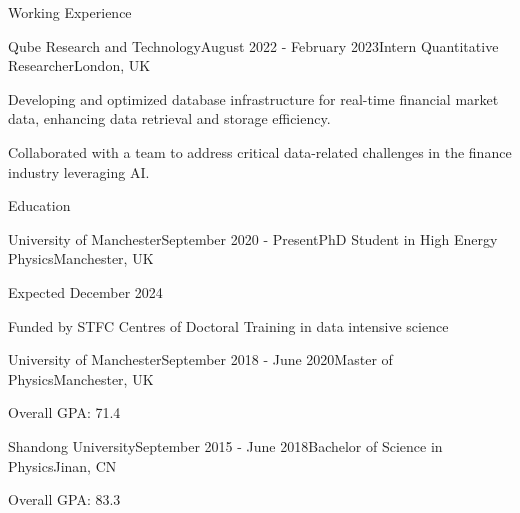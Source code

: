 \documentclass{resume} %
\begin{document}
    \begin{rSection}{Working Experience}
        \begin{rSubsection}{Qube Research and Technology}{August 2022 - February 2023}{Intern Quantitative Researcher}{London, UK}
            \item Developing and optimized database infrastructure for real-time financial market data, enhancing data retrieval and storage efficiency.
            \item Collaborated with a team to address critical data-related challenges in the finance industry leveraging AI.
        \end{rSubsection}
    \end{rSection}



    \begin{rSection}{Education}
        \begin{rSubsection}{University of Manchester}{September 2020 - Present}{PhD Student in High Energy Physics}{Manchester, UK}
            \item Expected December 2024 
            \item Funded by STFC Centres of Doctoral Training in data intensive science
        \end{rSubsection}
        \begin{rSubsection}{University of Manchester}{September 2018 - June 2020}{Master of Physics}{Manchester, UK}
            \item Overall GPA: 71.4
        \end{rSubsection}
        \begin{rSubsection}{Shandong University}{September 2015 - June 2018}{Bachelor of Science in Physics}{Jinan, CN}
            \item Overall GPA: 83.3
        \end{rSubsection}
    \end{rSection}
\end{document}
